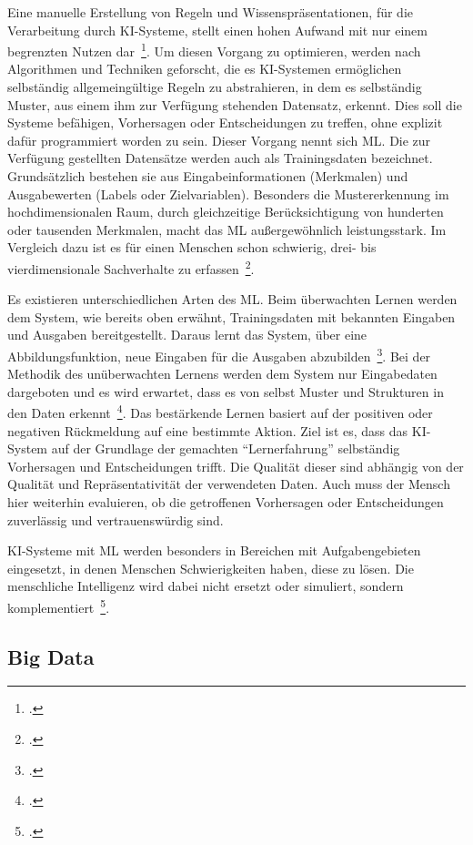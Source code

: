 Eine manuelle Erstellung von Regeln und Wissenspräsentationen, für die Verarbeitung durch \ac{KI}-Systeme, stellt einen hohen Aufwand mit nur einem begrenzten Nutzen dar~\footcite[\vglf][]{Matzka.2021}.
Um diesen Vorgang zu optimieren, werden nach Algorithmen und Techniken geforscht, die es \ac{KI}-Systemen ermöglichen selbständig allgemeingültige Regeln zu abstrahieren, in dem es selbständig Muster, aus einem ihm zur Verfügung stehenden
Datensatz, erkennt. Dies soll die Systeme befähigen, Vorhersagen oder Entscheidungen zu treffen, ohne explizit dafür programmiert worden zu sein. Dieser Vorgang nennt sich \ac{ML}.
Die zur Verfügung gestellten Datensätze werden auch als Trainingsdaten bezeichnet. Grundsätzlich bestehen sie aus Eingabeinformationen (Merkmalen) und Ausgabewerten (Labels oder Zielvariablen).
Besonders die Mustererkennung im hochdimensionalen Raum, durch gleichzeitige Berücksichtigung von hunderten oder tausenden Merkmalen, macht das \ac{ML} außergewöhnlich leistungsstark. Im Vergleich dazu ist es für einen Menschen
schon schwierig, drei- bis vierdimensionale Sachverhalte zu erfassen~\footcite[\vglf][]{Matzka.2021}.

Es existieren unterschiedlichen Arten des \ac{ML}. Beim überwachten Lernen werden dem System, wie bereits oben erwähnt, Trainingsdaten mit bekannten Eingaben und Ausgaben bereitgestellt. Daraus lernt 
das System, über eine Abbildungsfunktion, neue Eingaben für die Ausgaben abzubilden~\footcite[\vglf][]{Plaue.2021}. Bei der Methodik des unüberwachten Lernens werden dem System nur Eingabedaten dargeboten und es wird erwartet,
dass es von selbst Muster und Strukturen in den Daten erkennt~\footcite[\vglf][]{Plaue.2021}. 
Das bestärkende Lernen basiert auf der positiven oder negativen Rückmeldung auf eine bestimmte Aktion. 
Ziel ist es, dass das \ac{KI}-System auf der Grundlage der gemachten \enquote{Lernerfahrung} selbständig Vorhersagen und Entscheidungen trifft. 
Die Qualität dieser sind abhängig von der Qualität und Repräsentativität der verwendeten Daten. Auch muss der Mensch hier weiterhin evaluieren, ob die getroffenen Vorhersagen oder Entscheidungen
zuverlässig und vertrauenswürdig sind.

\ac{KI}-Systeme mit \ac{ML} werden besonders in Bereichen mit Aufgabengebieten eingesetzt, in denen Menschen Schwierigkeiten haben, diese zu lösen. Die menschliche Intelligenz wird dabei nicht ersetzt
oder simuliert, sondern komplementiert~\footcite[\vglf][]{Matzka.2021}.


\subsection{Big Data}

